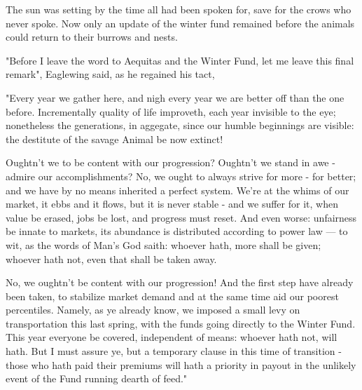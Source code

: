 


The sun was setting by the time all had been spoken for, save for the crows who never spoke. Now only an update of the winter fund remained before the animals could return to their burrows and nests.

"Before I leave the word to Aequitas and the Winter Fund, let me leave this final remark", Eaglewing said, as he regained his tact,

"Every year we gather here, and nigh every year we are better off than the one before. Incrementally quality of life improveth, each year invisible to the eye; nonetheless the generations, in aggegate, since our humble beginnings are visible: the destitute of the savage Animal be now extinct!

Oughtn't we to be content with our progression? Oughtn't we stand in awe - admire our accomplishments? No, we ought to always strive for more - for better; and we have by no means inherited a perfect system. We're at the whims of our market, it ebbs and it flows, but it is never stable - and we suffer for it, when value be erased, jobs be lost, and progress must reset. And even worse: unfairness be innate to markets, its abundance is distributed according to power law — to wit, as the words of Man's God saith: whoever hath, more shall be given; whoever hath not, even that shall be taken away.

No, we oughtn't be content with our progression! And the first step have already been taken, to stabilize market demand and at the same time aid our poorest percentiles. Namely, as ye already know, we imposed a small levy on transportation this last spring, with the funds going directly to the Winter Fund. This year everyone be covered, independent of means: whoever hath not, will hath. But I must assure ye, but a temporary clause in this time of transition - those who hath paid their premiums will hath a priority in payout in the unlikely event of the Fund running dearth of feed."

